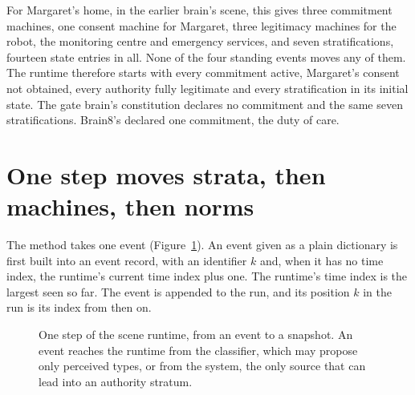 For Margaret's home, in the earlier brain's scene, this gives three commitment machines, one consent machine for Margaret, three
legitimacy machines for the robot, the monitoring centre and emergency services, and seven
stratifications, fourteen state entries in all. None of the four standing events moves any of them.
The runtime therefore starts with every commitment active, Margaret's consent not obtained, every
authority fully legitimate and every stratification in its initial state. The gate
brain's constitution declares no commitment and the same seven
stratifications. Brain8's declared one commitment, the duty of care.

\section{One step moves strata, then machines, then norms}\label{sec:runtime-step}

The method  takes one event (Figure~\ref{fig:runtime-step}). An event given as a plain
dictionary is first built into an event record, with an identifier $k$ and, when it has
no time index, the runtime's current time index plus one. The runtime's time index is the largest
seen so far. The event is appended to the run, and its position $k$ in the run is its index from
then on.

\begin{figure}[t]
\centering

\caption{One step of the scene runtime, from an event to a snapshot. An event reaches the runtime
from the classifier, which may propose only perceived types, or from the system, the only source
that can lead into an authority stratum.}
\label{fig:runtime-step}
\end{figure}

